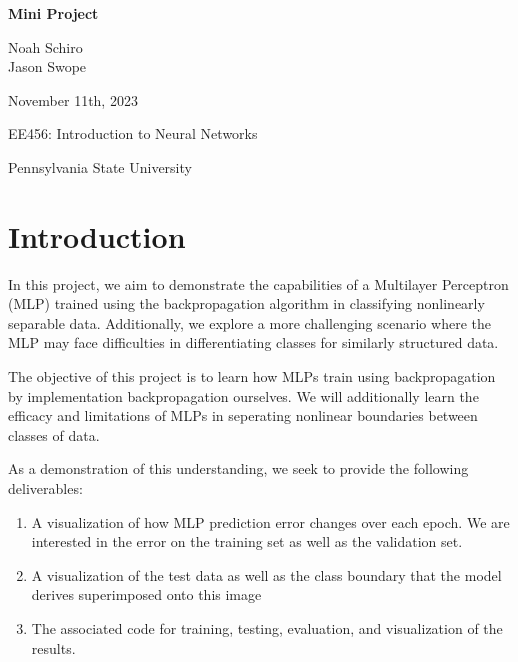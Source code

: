 \documentclass[letterpaper, 12pt]{article}
\begin{document}


\begin{titlepage}
    \begin{center}
        \vspace*{1in}
        \Huge{\textbf{Mini Project}}
        
        \vspace{0.5in}
        \Large{Noah Schiro}\\
        \Large{Jason Swope}
        
        \vfill
        
        \normalsize{November 11th, 2023}
        
        \vspace{0.5in}
        
        \normalsize{EE456: Introduction to Neural Networks}
        
        \vspace{0.5in}
        
        \normalsize{Pennsylvania State University}
        
    \end{center}
\end{titlepage}

\newpage

\setlength{\parindent}{5ex}

\section{Introduction}
In this project, we aim to demonstrate the capabilities of a Multilayer Perceptron (MLP) trained using the backpropagation algorithm in classifying nonlinearly separable data. Additionally, we explore a more challenging scenario where the MLP may face difficulties in differentiating classes for similarly structured data.

The objective of this project is to learn how MLPs train using backpropagation by implementation backpropagation ourselves. We will additionally learn the efficacy and limitations of MLPs in seperating nonlinear boundaries between classes of data. 

As a demonstration of this understanding, we seek to provide the following deliverables:

\begin{enumerate}
\item A visualization of how MLP prediction error changes over each epoch. We are interested in the error on the training set as well as the validation set. 
\item A visualization of the test data as well as the class boundary that the model derives superimposed onto this image
\item The associated code for training, testing, evaluation, and visualization of the results.
\end{enumerate}
\end{document}
